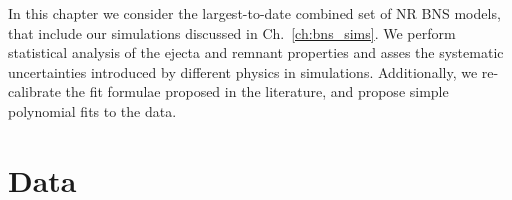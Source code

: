 In this chapter we consider the largest-to-date combined set of \ac{NR} \ac{BNS} models, that 
include our simulations discussed in Ch.~\ref{ch:bns_sims}. 
%
We perform statistical analysis of the ejecta and remnant properties and asses the 
systematic uncertainties introduced by different physics in simulations.
Additionally, we re-calibrate the fit formulae proposed in the literature, and propose  
simple polynomial fits to the data.




\section{Data} 

